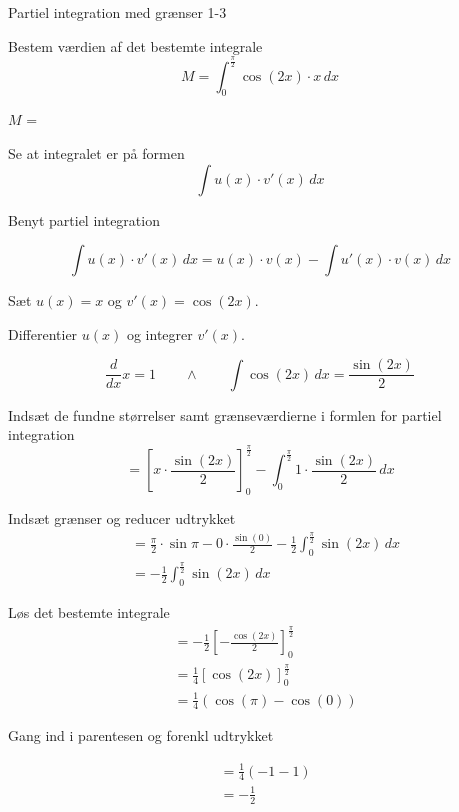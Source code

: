 \documentclass{article}
\begin{document}
\begin{exercise}{Partiel integration med grænser 1-3}
	
	Bestem værdien af det bestemte integrale
	\[
	M = \int_0^{\frac{\pi}{2}} \cos(2x) \cdot x \, dx
	\]
	
	$M$ =  
	
	
	\hint
	
	Se at integralet er på formen
	\[
	\int u(x) \cdot v'(x) \, dx
	\]
	
	\hint
	
	Benyt partiel integration
	
	\hint
	\[
	\int u(x) \cdot v'(x)\, dx = u(x) \cdot v(x) - \int u'(x) \cdot v(x) \, dx
	\]
	\hint
	
	Sæt $u(x) = x$ og $v'(x) = \cos(2x)$.
	
	
	\hint
	
	Differentier $u(x)$ og integrer $v'(x)$.
	
	\hint
	\[
	\frac{d}{dx}x = 1 \qquad \wedge \qquad \int \cos(2x) \, dx = \frac{\sin(2x)}{2}
	\]
	
	\hint
	
	Indsæt de fundne størrelser samt grænseværdierne i formlen for partiel integration 
	\[
	= \left[x \cdot \frac{\sin(2x)}{2}\right]_{0}^{\frac{\pi}{2}} - \int_{0}^{\frac{\pi}{2}} 1 \cdot \frac{\sin(2x)}{2} \, dx
	\]
	
	\hint
	
	Indsæt grænser og reducer udtrykket
	\begin{align*}
	&=  \frac{\pi}{2} \cdot \sin{\pi} - 0 \cdot \frac{\sin(0)}{2}  - \frac{1}{2} \int_{0}^{\frac{\pi}{2}} \sin(2x)  \, dx  \\
	& = - \frac{1}{2} \int_{0}^{\frac{\pi}{2}} \sin(2x)  \, dx
	\end{align*}
	
	\hint
	Løs det bestemte integrale
	\begin{align*}
	&= - \frac{1}{2} \left[ - \frac{\cos(2x)}{2}  \right]_{0}^{\frac{\pi}{2}} \\
	&= \frac{1}{4} \left[ \cos(2x) \right]_{0}^{\frac{\pi}{2}} \\
	&= \frac{1}{4} \left( \cos(\pi) - \cos(0) \right) 
	\end{align*}
	
	\hint
	Gang ind i parentesen og forenkl udtrykket
	
	\hint
	\begin{align*}
	&= \frac{1}{4} (-1 -1) \\
	&= - \frac{1}{2}
	\end{align*}
	
	
	
\end{exercise}
\end{document}

